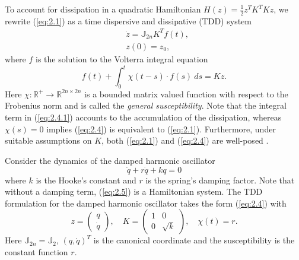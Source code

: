 To account for dissipation in a quadratic Hamiltonian $H(z) = \frac 1 2 z^T K^T K  z$, we rewrite (\ref{eq:2.1}) as a time dispersive and dissipative (TDD) \cite{Figotin:2006jy} system 
\begin{equation} \label{eq:2.4}
	\begin{aligned}
		& \dot {z} = \mathbb J_{2n} K^T f(t), \\
		& z(0) = z_0,
	\end{aligned}
\end{equation}
where $f$ is the solution to the Volterra integral equation \cite{corduneanu1991integral}
\begin{equation} \label{eq:2.4.1}
	f(t) + \int_0^t \chi(t-s) \cdot f(s)\ ds = K z.
\end{equation}
Here $\chi:\mathbb R^+\to \mathbb R^{2n\times 2n}$ is a bounded matrix valued function with respect to the Frobenius norm and is called the \emph{general susceptibility}. Note that the integral term in (\ref{eq:2.4.1}) accounts to the accumulation of the dissipation, whereas $\chi(s) = 0$ implies (\ref{eq:2.4}) is equivalent to (\ref{eq:2.1}). Furthermore, under suitable assumptions on $K$, both (\ref{eq:2.1}) and (\ref{eq:2.4}) are well-posed \cite{Figotin:2006jy}.

\begin{example} \label{example:2.1}
Consider the dynamics of the damped harmonic oscillator
\begin{equation} \label{eq:2.5}
	\ddot q + r \dot q + k q = 0
\end{equation}
where $k$ is the Hooke's constant and $r$ is the spring's damping factor. Note that without a damping term, (\ref{eq:2.5}) is a Hamiltonian system. {\edit The TDD formulation for the damped harmonic oscillator takes the form (\ref{eq:2.4}) with
\begin{equation}
	z = \begin{pmatrix}
	q \\ \dot q
	\end{pmatrix},
       	\quad K = 
	\begin{pmatrix}
	1 & 0 \\
	0 & \sqrt{k}
	\end{pmatrix}, \quad \chi(t) = r.
\end{equation}
Here $\mathbb J_{2n} = \mathbb J_{2}$, $(q,\dot q)^T$ is the canonical coordinate and the susceptibility is the constant function $r$.
}
\end{example}

